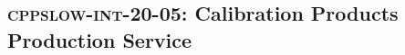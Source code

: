 \subsection{\textsc{cppslow-int-20-05}: Calibration Products Production Service}
\label{cppslow-int-20-05}
